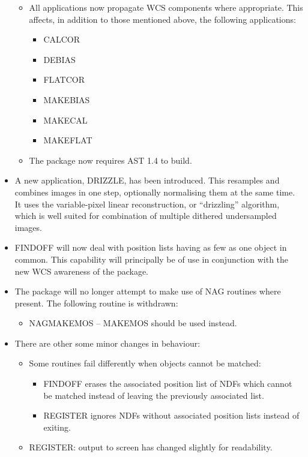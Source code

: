 \documentclass[twoside,11pt]{article}
\newcommand{\htmlref}[2]{#1}
\renewcommand{\_}{\texttt{\symbol{95}}}
\newcommand{\routine}[1]{{\sc #1}}
\newcommand{\xroutine}[1]{\htmlref{{\sc #1}}{#1}}
\begin{document}
\begin{itemize}
\begin{itemize}
    \item
    All applications now propagate WCS components where appropriate.
    This affects, in addition to those mentioned above, 
    the following applications:
       \begin{itemize}
       \item \xroutine{CALCOR}
       \item \xroutine{DEBIAS}
       \item \xroutine{FLATCOR}
       \item \xroutine{MAKEBIAS}
       \item \xroutine{MAKECAL}
       \item \xroutine{MAKEFLAT}
       \end{itemize}
    \item
    The package now requires AST 1.4 to build.
    \end{itemize}
\item
    A new application, \xroutine{DRIZZLE}, has been introduced.  
    This resamples and
    combines images in one step, optionally normalising them at the same
    time.  It uses the variable-pixel linear reconstruction, or 
    ``drizzling'' algorithm, which is well suited for combination of
    multiple dithered undersampled images.
\item
    \xroutine{FINDOFF} 
    will now deal with position lists having as few as one object
    in common.  This capability will principally be of use in conjunction
    with the new WCS awareness of the package.
\item
    The package will no longer attempt to make use of NAG routines where
    present.  The following routine is withdrawn:
    \begin{itemize}
    \item \routine{NAGMAKEMOS} -- \xroutine{MAKEMOS} should be used instead.
    \end{itemize}
\item  
    There are other some minor changes in behaviour:
    \begin{itemize}
    \item
       Some routines fail differently when objects cannot be matched:
       \begin{itemize}
       \item
          FINDOFF erases the associated position list of NDFs which
             cannot be matched instead of leaving the previously 
             associated list.
       \item
          REGISTER ignores NDFs without associated position lists 
             instead of exiting.
       \end{itemize}
    \item
    REGISTER: output to screen has changed slightly for readability.
    \end{itemize}
\end{itemize}
\end{document}
